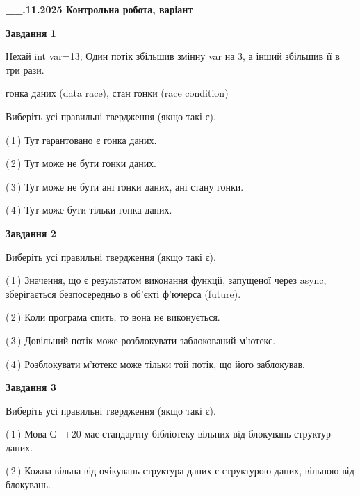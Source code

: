 \documentclass[12pt, ukrainian]{article}
\begin{document}
\begin {large}

\textbf{\_\_.11.2025 Контрольна робота, варіант  }\par


{

\begin{center}
\textbf{Завдання 1}
\end{center}
Нехай int var=13; Один потік збільшив змінну var на 3, а інший збільшив її в три рази.

гонка даних (data race), стан гонки (race condition)

Виберіть усі правильні твердження (якщо такі є).\par
\vspace{2mm}
(\,1\,) Тут гарантовано є гонка даних.%

(\,2\,) Тут може не бути гонки даних.%

(\,3\,) Тут може не бути ані гонки даних, ані стану гонки.%

(\,4\,) Тут може бути тільки гонка даних.%



\begin{center}
\textbf{Завдання 2}
\end{center}
Виберіть усі правильні твердження (якщо такі є).\par
\vspace{2mm}

(\,1\,) Значення, що є результатом виконання функції, запущеної через async, зберігається безпосередньо в об’єкті ф’ючерса (future).%

(\,2\,) Коли програма спить, то вона не виконується.%

(\,3\,) Довільний потік може розблокувати заблокований м’ютекс.%

(\,4\,) Розблокувати м’ютекс може тільки той потік, що його заблокував.%



\begin{center}
\textbf{Завдання 3}
\end{center}
Виберіть усі правильні твердження (якщо такі є).\par
\vspace{2mm}

(\,1\,) Мова С++20 має стандартну бібліотеку вільних від блокувань структур даних.%

(\,2\,) Кожна вільна від очікувань структура даних є структурою даних, вільною від блокувань.%

}
\end{large}
\end{document}
